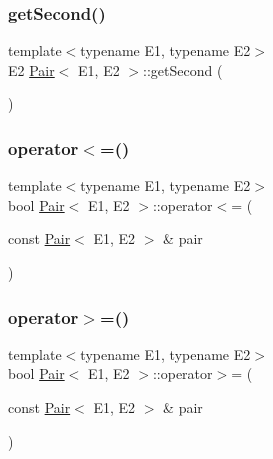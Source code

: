 \mbox{\label{classPair_a8df972c70a2f8fd3ee564c9d322bf30b}} 
\subsubsection{\texorpdfstring{get\+Second()}{getSecond()}}
{\footnotesize\ttfamily template$<$typename E1, typename E2$>$ \\
E2 \hyperlink{classPair}{Pair}$<$ E1, E2 $>$\+::get\+Second (\begin{DoxyParamCaption}{ }\end{DoxyParamCaption})\hspace{0.3cm}{\ttfamily [inline]}}

\mbox{\label{classPair_a8f20084cc163e96cbfbae0281ffc7f9f}} 
\subsubsection{\texorpdfstring{operator$<$=()}{operator<=()}}
{\footnotesize\ttfamily template$<$typename E1, typename E2$>$ \\
bool \hyperlink{classPair}{Pair}$<$ E1, E2 $>$\+::operator$<$= (\begin{DoxyParamCaption}\item[{const \hyperlink{classPair}{Pair}$<$ E1, E2 $>$ \&}]{pair }\end{DoxyParamCaption})\hspace{0.3cm}{\ttfamily [inline]}}

\mbox{\label{classPair_acf05dd1d9abb560c4a7db0b27117296e}} 
\subsubsection{\texorpdfstring{operator$>$=()}{operator>=()}}
{\footnotesize\ttfamily template$<$typename E1, typename E2$>$ \\
bool \hyperlink{classPair}{Pair}$<$ E1, E2 $>$\+::operator$>$= (\begin{DoxyParamCaption}\item[{const \hyperlink{classPair}{Pair}$<$ E1, E2 $>$ \&}]{pair }\end{DoxyParamCaption})\hspace{0.3cm}{\ttfamily [inline]}}

